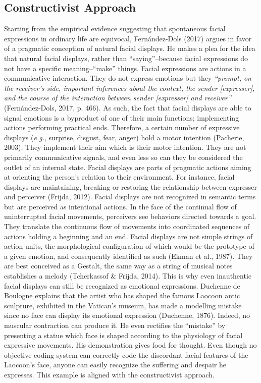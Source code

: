 \documentclass[
  english,
  man]{apa7}
\begin{document}
\hypertarget{constructivist-approach}{%
\subsection{Constructivist Approach}\label{constructivist-approach}}

Starting from the empirical evidence suggesting that spontaneous facial expressions in ordinary life are equivocal, Fernández-Dols (2017) argues in favor of a pragmatic conception of natural facial displays. He makes a plea for the idea that natural facial displays, rather than ``saying''--because facial expressions do not have a specific meaning--``make'' things. Facial expressions are actions in a communicative interaction. They do not express emotions but they \emph{``prompt, on the receiver's side, important inferences about the context, the sender {[}expresser{]}, and the course of the interaction between sender {[}expresser{]} and receiver''} (Fernández-Dols, 2017, p. 466). As such, the fact that facial displays are able to signal emotions is a byproduct of one of their main functions; implementing actions performing practical ends. Therefore, a certain number of expressive displays (\emph{e.g.}, surprise, disgust, fear, anger) hold a motor intention (Pacherie, 2003). They implement their aim which is their motor intention. They are not primarily communicative signals, and even less so can they be considered the outlet of an internal state. Facial displays are parts of pragmatic actions aiming at orienting the person's relation to their environment. For instance, facial displays are maintaining, breaking or restoring the relationship between expresser and perceiver (Frijda, 2012). Facial displays are not recognized in semantic terms but are perceived as intentional actions. In the face of the continual flow of uninterrupted facial movements, perceivers see behaviors directed towards a goal. They translate the continuous flow of movements into coordinated sequences of actions holding a beginning and an end. Facial displays are not simple strings of action units, the morphological configuration of which would be the prototype of a given emotion, and consequently identified as such (Ekman et al., 1987). They are best conceived as a Gestalt, the same way as a string of musical notes establishes a melody (Tcherkassof \& Frijda, 2014). This is why even inauthentic facial displays can still be recognized as emotional expressions. Duchenne de Boulogne explains that the artist who has shaped the famous Laocoon antic sculpture, exhibited in the Vatican's museum, has made a modelling mistake since no face can display its emotional expression (Duchenne, 1876). Indeed, no muscular contraction can produce it. He even rectifies the ``mistake'' by presenting a statue which face is shaped according to the physiology of facial expressive movements. His demonstration gives food for thought. Even though no objective coding system can correctly code the discordant facial features of the Laocoon's face, anyone can easily recognize the suffering and despair he expresses. This example is aligned with the constructivist approach.
\end{document}

